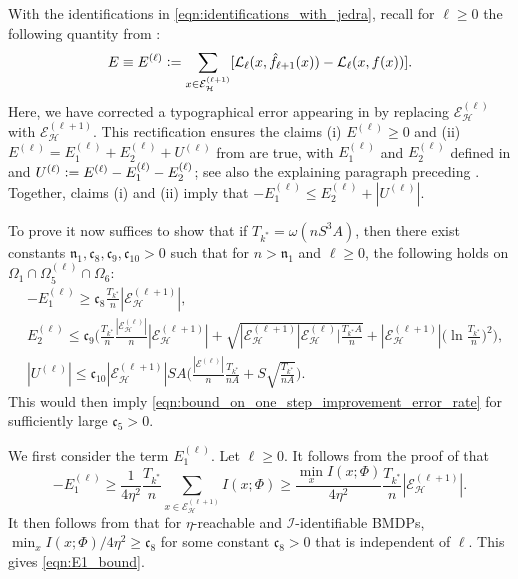 \documentclass[11pt]{article}
\newcommand{\eqdef}{\vcentcolon=}
\newcommand{\mf}[1]{\mathfrak{#1}}
\newcommand{\mcE}{\mathcal{E}}
\newcommand{\mcH}{\mathcal{H}}
\newcommand{\mcI}{\mathcal{I}}
\newcommand{\mcL}{\mathcal{L}}
\theoremstyle{definition}
\theoremstyle{definition}
\begin{document}
With the identifications in \eqref{eqn:identifications_with_jedra}, recall for $\ell\geq 0$ the following quantity from \cite[(86)]{Jedra:2022}:
\begin{equation}
	\label{eqn:E_term_correction}
	E
	\equiv
	E^{(\ell)}
	\eqdef
	\sum_{x\in \mcE_{\mcH}^{(\ell+1)}}
	[\mcL_{\ell}(x,\hat{f}_{\ell+1}(x))-\mcL_{\ell}(x,f(x))]
	.
\end{equation}
Here, we have corrected a typographical error appearing in \cite[(86)]{Jedra:2022} by replacing $\mcE_{\mcH}^{(\ell)}$ with $\mcE_{\mcH}^{(\ell+1)}$.
This rectification ensures the claims (i) $E^{(\ell)}\geq 0$ and (ii) $E^{(\ell)}=E_1^{(\ell)}+E_2^{(\ell)}+U^{(\ell)}$ from \cite{Jedra:2022} are true, with $E^{(\ell)}_1$ and $E^{(\ell)}_2$ defined in \cite[(87)--(89)]{Jedra:2022} and $U^{(\ell)}\eqdef E^{(\ell)}-E^{(\ell)}_1-E^{(\ell)}_2$; see also the explaining paragraph preceding \cite[(35)]{Sanders:2020}.
Together, claims (i) and (ii) imply that $-E^{(\ell)}_1\leq E^{(\ell)}_2 + |U^{(\ell)}|$.

To prove  it now suffices to show that if $T_{k^*}=\omega(nS^3A)$, then there exist constants $\mf{n}_{1}, \mf{c}_8, \mf{c}_9, \mf{c}_{10}>0$ such that for $n>\mf{n}_{1}$ and $\ell\geq 0$, the following holds on $\Omega_1\cap\Omega_5^{(\ell)}\cap\Omega_6$:
\begin{align}
	 &
	-
	E^{(\ell)}_1
	\geq
	\mf{c}_8\frac{T_{k^*}}{n}|\mcE_{\mcH}^{(\ell+1)}|
	,
	\label{eqn:E1_bound}
	\\
	 &
	E^{(\ell)}_2
	\leq
	\mf{c}_9
	\biggl(
	\frac{T_{k^*}}{n}
	\frac{|\mcE_{\mcH}^{(\ell)}|}{n}
	|\mcE_{\mcH}^{(\ell+1)}|
	+
	\sqrt{|\mcE_{\mcH}^{(\ell+1)}|\mcE_{\mcH}^{(\ell)}|\frac{T_{k^*}A}{n}}
	+
	|\mcE^{(\ell+1)}_{\mcH}|\biggl(\ln \frac{T_{k^*}}{n}\biggr)^2
	\biggr)
	,
	\label{eqn:E2_bound}
	\\
	 &
	|U^{(\ell)}|
	\leq
	\mf{c}_{10}
	|\mcE_{\mcH}^{(\ell+1)}|
	SA
	\biggl(
	\frac{|\mcE^{(\ell)}|}{n}
	\frac{T_{k^*}}{nA}
	+
	S\sqrt{\frac{T_{k^*}}{nA}}
	\biggr)
	.
	\label{eqn:U_bound}
\end{align}
This would then imply \eqref{eqn:bound_on_one_step_improvement_error_rate} for sufficiently large $\mf{c}_5>0$.

We first consider the term $E_1^{(\ell)}$.
Let $\ell\geq 0$.
It follows from the proof of \cite[Lemma 21]{Jedra:2022} that
\begin{equation}
	-
	E^{(\ell)}_1
	\geq
	\frac{1}{4\eta^2}
	\frac{T_{k^*}}{n}
	\sum_{x\in\mcE_{\mcH}^{(\ell+1)}}
	I(x;\Phi)
	\geq
	\frac{\min_{x}I(x;\Phi)}{4\eta^2}
	\frac{T_{k^*}}{n}
	|\mcE_{\mcH}^{(\ell+1)}|
	.
\end{equation}
It then follows from  that for $\eta$-reachable and $\mcI$-identifiable \glspl{BMDP}, $\min_{x}I(x;\Phi)\allowbreak /4\eta^2\geq \mf{c}_8$ for some constant $\mf{c}_8>0$ that is independent of $\ell$.
This gives \eqref{eqn:E1_bound}.
\end{document}
